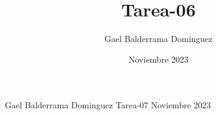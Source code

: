 \documentclass{article}
\author{Gael Balderrama Dominguez}
\title{Tarea-06}
\date{Noviembre 2023}
\begin{document}
\begin{center}
    Gael Balderrama Dominguez \linebreak
    Tarea-07 \linebreak
    Noviembre 2023 \linebreak
\end{center}
\end{document}
